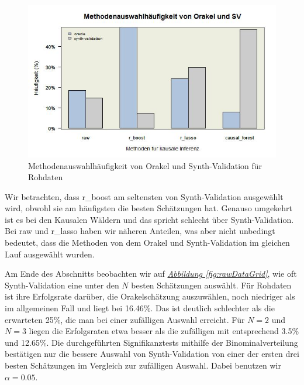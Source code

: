\documentclass[12pt,a4paper,twoside]{scrartcl}
\numberwithin{equation}{section}
\newcommand{\reffig}[1]{\emph{\hyperref[#1]{Abbildung \ref*{#1}}}}
\begin{document}
\begin{center}
\begin{figure}[h]
    \centering
    \includegraphics[height=0.5\textwidth, width=1\textwidth]{figures/plots/rawDataBarplot.jpeg}
    \caption[Methodenauswahlhäufigkeit von Orakel und Synth-Validation für Rohdaten]{Methodenauswahlhäufigkeit von Orakel und Synth-Validation für Rohdaten}\label{fig:rawDataBarplot}
  \end{figure}
\end{center}

\noindent
Wir betrachten, dass r\_boost am seltensten von Synth-Validation ausgewählt wird, obwohl sie am häufigsten die besten Schätzungen hat. Genauso umgekehrt ist es bei den Kausalen Wäldern und das spricht schlecht über Synth-Validation. Bei raw und r\_lasso haben wir näheren Anteilen, was aber nicht unbedingt bedeutet, dass die Methoden von dem Orakel und Synth-Validation im gleichen Lauf ausgewählt wurden. \par

\noindent
Am Ende des Abschnitts beobachten wir auf \reffig{fig:rawDataGrid}, wie oft Synth-Validation eine unter den $N$ besten Schätzungen auswählt. Für Rohdaten ist ihre Erfolgsrate darüber, die Orakelschätzung auszuwählen, noch niedriger als im allgemeinen Fall und liegt bei 16.46\%. Das ist deutlich schlechter als die erwarteten 25\%, die man bei einer zufälligen Auswahl erreicht. Für $N=2$ und $N=3$ liegen die Erfolgsraten etwa besser als die zufälligen mit entsprechend 3.5\% und 12.65\%. Die durchgeführten Signifikanztests mithilfe der Binominalverteilung bestätigen nur die bessere Auswahl von Synth-Validation von einer der ersten drei besten Schätzungen im Vergleich zur zufälligen Auswahl. Dabei benutzen wir $\alpha = 0.05$. \par
\end{document}
